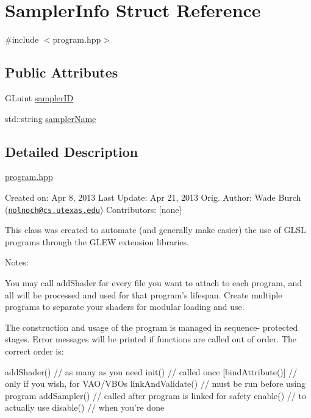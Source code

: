 \hypertarget{structSamplerInfo}{\section{Sampler\-Info Struct Reference}
\label{structSamplerInfo}
}


{\ttfamily \#include $<$program.\-hpp$>$}

\subsection*{Public Attributes}
\begin{DoxyCompactItemize}
\item 
G\-Luint \hyperlink{structSamplerInfo_a59a388ce01f16caf9e2b5ec1bf14ac9e}{sampler\-I\-D}
\item 
std\-::string \hyperlink{structSamplerInfo_a7906eb3a44b5726904ab84e971e83214}{sampler\-Name}
\end{DoxyCompactItemize}


\subsection{Detailed Description}
\hyperlink{program_8hpp_source}{program.\-hpp}

Created on\-: Apr 8, 2013 Last Update\-: Apr 21, 2013 Orig. Author\-: Wade Burch (\href{mailto:nolnoch@cs.utexas.edu}{\tt nolnoch@cs.\-utexas.\-edu}) Contributors\-: \mbox{[}none\mbox{]}

This class was created to automate (and generally make easier) the use of G\-L\-S\-L programs through the G\-L\-E\-W extension libraries.

Notes\-:

You may call add\-Shader for every file you want to attach to each program, and all will be processed and used for that program's lifespan. Create multiple programs to separate your shaders for modular loading and use.

The construction and usage of the program is managed in sequence-\/ protected stages. Error messages will be printed if functions are called out of order. The correct order is\-: \begin{DoxyVerb}  addShader()         // as many as you need
  init()              // called once
  [bindAttribute()]   // only if you wish, for VAO/VBOs
  linkAndValidate()   // must be run before using program
  addSampler()        // called after program is linked for safety
  enable()            // to actually use
  disable()           // when you're done
\end{DoxyVerb}


